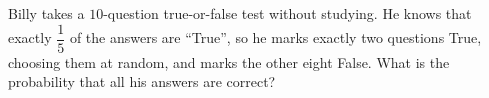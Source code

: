 Billy takes a $10$-question true-or-false test without studying. He knows that exactly $\dfrac15$ of the answers are ``True'', so he marks exactly two questions True, choosing them at random, and marks the other eight False. What is the probability that all his answers are correct?

